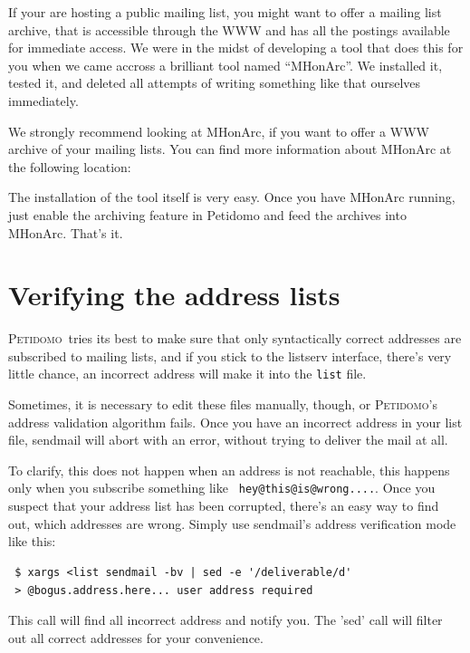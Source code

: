 \documentclass[a4paper]{report}
\newcommand{\Petidomo}{{\scshape Peti\-domo}}
\newcommand{\file}[1]{{\tt #1}}
\begin{document}
If your are hosting a public mailing list, you might want to offer a
mailing list archive, that is accessible through the WWW and has all
the postings available for immediate access. We were in the midst of
developing a tool that does this for you when we came accross a
brilliant tool named ``MHonArc''. We installed it, tested it, and
deleted all attempts of writing something like that ourselves
immediately.

We strongly recommend looking at MHonArc, if you want to offer a WWW
archive of your mailing lists. You can find more information about
MHonArc at the following location:

The installation of the tool itself is very easy. Once you have
MHonArc running, just enable the archiving feature in Petidomo and
feed the archives into MHonArc. That's it.

\section{Verifying the address lists}

\Petidomo\ tries its best to make sure that only syntactically correct
addresses are subscribed to mailing lists, and if you stick to the
listserv interface, there's very little chance, an incorrect address
will make it into the \file{list} file.

Sometimes, it is necessary to edit these files manually, though, or
\Petidomo's address validation algorithm fails. Once you have an
incorrect address in your list file, sendmail will abort with an
error, without trying to deliver the mail at all.

To clarify, this does not happen when an address is not reachable,
this happens only when you subscribe something like {\tt
hey@this@is@wrong....}. Once you suspect that your address list has
been corrupted, there's an easy way to find out, which addresses are
wrong. Simply use sendmail's address verification mode like this:

\begin{verbatim}
 $ xargs <list sendmail -bv | sed -e '/deliverable/d'
 > @bogus.address.here... user address required
\end{verbatim}

This call will find all incorrect address and notify you. The 'sed'
call will filter out all correct addresses for your convenience.
\end{document}
